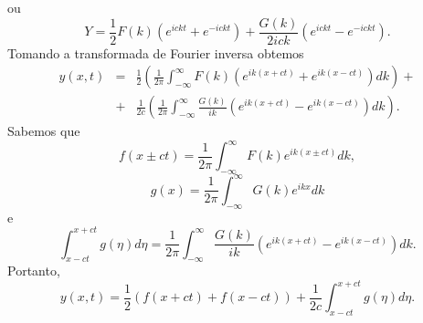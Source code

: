 ou
\begin{equation*}
Y=\frac{1}{2}F(k)(e^{ickt}+e^{-ickt})+\frac{G(k)}{2ick}(e^{ickt}-e^{-ickt}).
\end{equation*}
Tomando a transformada de Fourier inversa obtemos
\begin{eqnarray*}
y(x,t)&=&\frac{1}{2}\left(\frac{1}{2
\pi}\int_{-\infty}^\infty
F(k)(e^{ik(x+ct)}+e^{ik(x-ct)})dk\right)+\\&+&\frac{1}{2c}\left(\frac{1}{2
\pi}\int_{-\infty}^\infty
\frac{G(k)}{ik}(e^{ik(x+ct)}-e^{ik(x-ct)})dk \right).
\end{eqnarray*}
Sabemos que
\begin{equation*}
f(x\pm ct)=\frac{1}{2\pi}\int_{-\infty}^\infty
F(k)e^{ik (x\pm ct)}dk,
\end{equation*}
\begin{equation*}
g(x)=\frac{1}{2\pi}\int_{-\infty}^\infty G(k)e^{ik
x}dk
\end{equation*}
e
\begin{equation*}
\int_{x-ct}^{x+ct}
g(\eta)d\eta=\frac{1}{2\pi}\int_{-\infty}^\infty
\frac{G(k)}{i k} (e^{ik(x+ct)}-e^{ik(x-ct)})dk.
\end{equation*}
Portanto,
\begin{equation*}
y(x,t)=\frac{1}{2} \left( f(x+ct)+f(x-ct)
\right)+\frac{1}{2c}\int_{x-ct}^{x+ct}g(\eta)d\eta.
\end{equation*}
